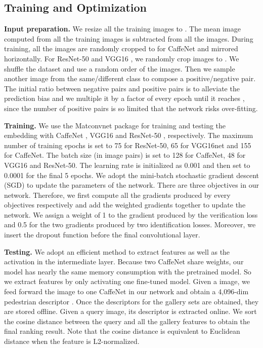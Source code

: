 \documentclass[journal]{IEEEtran}
\begin{document}
\subsection{Training and Optimization} \label{3.6}

\textbf{Input preparation.} We resize all the training images to . The mean image computed from all the training images is subtracted from all the images. During training, all the images are randomly cropped to  for CaffeNet \cite{krizhevsky2012imagenet} and mirrored horizontally. For ResNet-50 \cite{he2016deep} and VGG16 \cite{simonyan2014very}, we randomly crop images to . We shuffle the dataset and use a random order of the images. Then we sample another image from the same/different class to compose a positive/negative pair. The initial ratio between negative pairs and positive pairs is  to alleviate the prediction bias and we multiple it by a factor of  every epoch until it reaches , since the number of positive pairs is so limited that the network risks over-fitting. 

\textbf{Training.} We use the Matconvnet \cite{vedaldi15matconvnet} package for training and testing the embedding with CaffeNet \cite{krizhevsky2012imagenet}, VGG16 \cite{simonyan2014very} and ResNet-50 \cite{he2016deep}, respectively. The maximum number of training epochs is set to 75 for ResNet-50, 65 for VGG16net and 155 for CaffeNet. The batch size (in image pairs) is set to 128 for CaffeNet, 48 for VGG16 and ResNet-50. The learning rate is initialized as 0.001 and then set to 0.0001 for the final 5 epochs. We adopt the mini-batch stochastic gradient descent (SGD) to update the parameters of the network. There are three objectives in our network. Therefore, we first compute all the gradients produced by every objectives respectively and add the weighted gradients together to update the network. We assign a weight of 1 to the gradient produced by the verification loss and 0.5 for the two gradients produced by two identification losses. Moreover, we insert the dropout function \cite{srivastava2014dropout} before the final convolutional layer.

\textbf{Testing.} We adopt an efficient method to extract features as well as the activation in the intermediate layer. Because two CaffeNet share weights, our model has nearly the same memory consumption with the pretrained model. So we extract features by only activating one fine-tuned model. Given a  image, we feed forward the image to one CaffeNet in our network and obtain a 4,096-dim pedestrian descriptor . Once the descriptors for the gallery sets are obtained, they are stored offline. Given a query image, its descriptor is extracted online. We sort the cosine distance between the query and all the gallery features to obtain the final ranking result. Note that the cosine distance is equivalent to Euclidean distance when the feature is L2-normalized.
\end{document}

